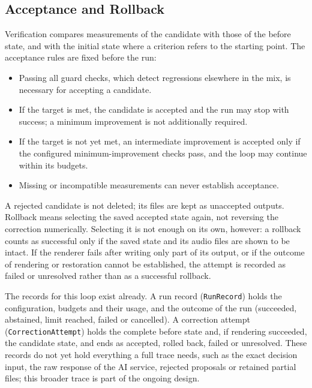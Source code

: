 \subsection{Acceptance and Rollback}
\label{sec:arch-acceptance}

Verification compares measurements of the candidate with those of the before state, and with the initial state where a criterion refers to the starting point. The acceptance rules are fixed before the run:

\begin{itemize}
	\item Passing all guard checks, which detect regressions elsewhere in the mix, is necessary for accepting a candidate.
	\item If the target is met, the candidate is accepted and the run may stop with success; a minimum improvement is not additionally required.
	\item If the target is not yet met, an intermediate improvement is accepted only if the configured minimum-improvement checks pass, and the loop may continue within its budgets.
	\item Missing or incompatible measurements can never establish acceptance.
\end{itemize}

A rejected candidate is not deleted; its files are kept as unaccepted outputs. Rollback means selecting the saved accepted state again, not reversing the correction numerically. Selecting it is not enough on its own, however: a rollback counts as successful only if the saved state and its audio files are shown to be intact. If the renderer fails after writing only part of its output, or if the outcome of rendering or restoration cannot be established, the attempt is recorded as failed or unresolved rather than as a successful rollback.

The records for this loop exist already. A run record (\texttt{RunRecord}) holds the configuration, budgets and their usage, and the outcome of the run (succeeded, abstained, limit reached, failed or cancelled). A correction attempt (\texttt{CorrectionAttempt}) holds the complete before state and, if rendering succeeded, the candidate state, and ends as accepted, rolled back, failed or unresolved. These records do not yet hold everything a full trace needs, such as the exact decision input, the raw response of the \ac{AI} service, rejected proposals or retained partial files; this broader trace is part of the ongoing design.


